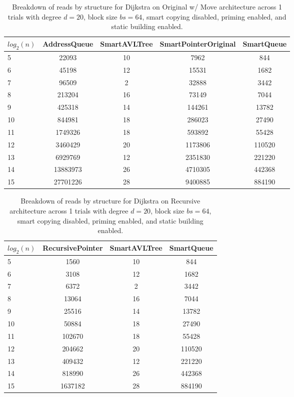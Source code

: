 \begin{table}[]
\centering
\begin{tabular}{|l|c|c|c|c|}
$log_2(n)$ & AddressQueue & SmartAVLTree & SmartPointerOriginal & SmartQueue \\ \hline
5 & 22093 & 10 & 7962 & 844 \\ \hline
6 & 45198 & 12 & 15531 & 1682 \\ \hline
7 & 96509 & 2 & 32888 & 3442 \\ \hline
8 & 213204 & 16 & 73149 & 7044 \\ \hline
9 & 425318 & 14 & 144261 & 13782 \\ \hline
10 & 844981 & 18 & 286023 & 27490 \\ \hline
11 & 1749326 & 18 & 593892 & 55428 \\ \hline
12 & 3460429 & 20 & 1173806 & 110520 \\ \hline
13 & 6929769 & 12 & 2351830 & 221220 \\ \hline
14 & 13883973 & 26 & 4710305 & 442368 \\ \hline
15 & 27701226 & 28 & 9400885 & 884190 \\ \hline
\end{tabular}
\caption{Breakdown of reads by structure for Dijkstra on Original w/ Move architecture across 1 trials with degree $d=20$, block size $bs=64$, smart copying disabled, priming enabled, and static building enabled.}
    \label{tab:reads_by_structure_dijkstra_d20_bs64_trials1_copiesfalse_primetrue_staticinsertiontrue_ptoriginal_movetrue}
\end{table}

\begin{table}[]
\centering
\begin{tabular}{|l|c|c|c|}
$log_2(n)$ & RecursivePointer & SmartAVLTree & SmartQueue \\ \hline
5 & 1560 & 10 & 844 \\ \hline
6 & 3108 & 12 & 1682 \\ \hline
7 & 6372 & 2 & 3442 \\ \hline
8 & 13064 & 16 & 7044 \\ \hline
9 & 25516 & 14 & 13782 \\ \hline
10 & 50884 & 18 & 27490 \\ \hline
11 & 102670 & 18 & 55428 \\ \hline
12 & 204662 & 20 & 110520 \\ \hline
13 & 409432 & 12 & 221220 \\ \hline
14 & 818990 & 26 & 442368 \\ \hline
15 & 1637182 & 28 & 884190 \\ \hline
\end{tabular}
\caption{Breakdown of reads by structure for Dijkstra on Recursive architecture across 1 trials with degree $d=20$, block size $bs=64$, smart copying disabled, priming enabled, and static building enabled.}
    \label{tab:reads_by_structure_dijkstra_d20_bs64_trials1_copiesfalse_primetrue_staticinsertiontrue_ptrecursive_movetrue}
\end{table}

